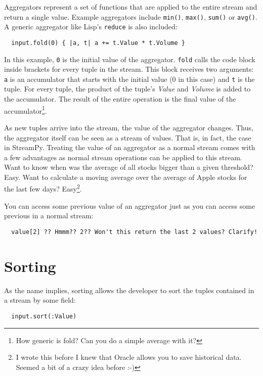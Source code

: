 \documentclass[twoside]{report}
\begin{document}
Aggregators represent a set of functions that are applied to the entire stream and return a single value. Example aggregators include \verb=min()=, \verb=max()=, \verb=sum()= or \verb=avg()=. A generic aggregator like Lisp's \verb=reduce= is also included:

\begin{verbatim}
  input.fold(0) { |a, t| a += t.Value * t.Volume }
\end{verbatim}

In this example, \verb=0= is the initial value of the aggregator. \verb=fold= calls the code block inside brackets for every tuple in the stream. This block receives two arguments: \verb=a= is an accumulator that starts with the initial value (0 in this case) and \verb=t= is the tuple. For every tuple, the product of the tuple's \emph{Value} and \emph{Volume} is added to the accumulator. The result of the entire operation is the final value of the accumulator\footnote{How generic is fold? Can you do a simple average with it?}.

As new tuples arrive into the stream, the value of the aggregator changes. Thus, the aggregator itself can be seen as a stream of values. That is, in fact, the case in StreamPy. Treating the value of an aggregator as a normal stream comes with a few advantages as normal stream operations can be applied to this stream. Want to know when was the average of all stocks bigger than a given threshold? Easy. Want to calculate a moving average over the average of Apple stocks for the last few days? Easy\footnote{I wrote this before I knew that Oracle allows you to save historical data. Seemed a bit of a crazy idea before :-)}.

You can access some previous value of an aggregator just as you can access some previous in a normal stream:

\begin{verbatim}
  value[2] ?? Hmmm?? 2?? Won't this return the last 2 values? Clarify!
\end{verbatim}


\section{Sorting}

As the name implies, sorting allows the developer to sort the tuples contained in a stream by some field:

\begin{verbatim}
  input.sort(:Value)
\end{verbatim}
\end{document}
